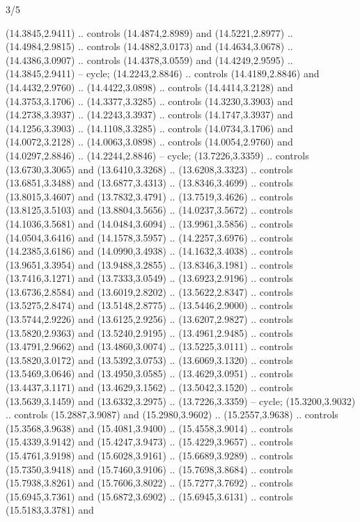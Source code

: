 \begin{flagdescription}{3/5}
{\begin{scope}[fill=gold]
 (14.3845,2.9411) .. controls (14.4874,2.8989) and
  (14.5221,2.8977) .. (14.4984,2.9815) .. controls (14.4882,3.0173) and
  (14.4634,3.0678) .. (14.4386,3.0907) .. controls (14.4378,3.0559) and
  (14.4249,2.9595) .. (14.3845,2.9411) -- cycle;
 (14.2243,2.8846) .. controls (14.4189,2.8846) and
  (14.4432,2.9760) .. (14.4422,3.0898) .. controls (14.4414,3.2128) and
  (14.3753,3.1706) .. (14.3377,3.3285) .. controls (14.3230,3.3903) and
  (14.2738,3.3937) .. (14.2243,3.3937) .. controls (14.1747,3.3937) and
  (14.1256,3.3903) .. (14.1108,3.3285) .. controls (14.0734,3.1706) and
  (14.0072,3.2128) .. (14.0063,3.0898) .. controls (14.0054,2.9760) and
  (14.0297,2.8846) .. (14.2244,2.8846) -- cycle;
 (13.7226,3.3359) .. controls (13.6730,3.3065) and
  (13.6410,3.3268) .. (13.6208,3.3323) .. controls (13.6851,3.3488) and
  (13.6877,3.4313) .. (13.8346,3.4699) .. controls (13.8015,3.4607) and
  (13.7832,3.4791) .. (13.7519,3.4626) .. controls (13.8125,3.5103) and
  (13.8804,3.5656) .. (14.0237,3.5672) .. controls (14.1036,3.5681) and
  (14.0484,3.6094) .. (13.9961,3.5856) .. controls (14.0504,3.6416) and
  (14.1578,3.5957) .. (14.2257,3.6976) .. controls (14.2385,3.6186) and
  (14.0990,3.4938) .. (14.1632,3.4038) .. controls (13.9651,3.3954) and
  (13.9488,3.2855) .. (13.8346,3.1981) .. controls (13.7416,3.1271) and
  (13.7333,3.0549) .. (13.6923,2.9196) .. controls (13.6736,2.8584) and
  (13.6019,2.8202) .. (13.5622,2.8347) .. controls (13.5275,2.8474) and
  (13.5148,2.8775) .. (13.5446,2.9000) .. controls (13.5744,2.9226) and
  (13.6125,2.9256) .. (13.6207,2.9827) .. controls (13.5820,2.9363) and
  (13.5240,2.9195) .. (13.4961,2.9485) .. controls (13.4791,2.9662) and
  (13.4860,3.0074) .. (13.5225,3.0111) .. controls (13.5820,3.0172) and
  (13.5392,3.0753) .. (13.6069,3.1320) .. controls (13.5469,3.0646) and
  (13.4950,3.0585) .. (13.4629,3.0951) .. controls (13.4437,3.1171) and
  (13.4629,3.1562) .. (13.5042,3.1520) .. controls (13.5639,3.1459) and
  (13.6332,3.2975) .. (13.7226,3.3359) -- cycle;
 (15.3200,3.9032) .. controls (15.2887,3.9087) and
  (15.2980,3.9602) .. (15.2557,3.9638) .. controls (15.3568,3.9638) and
  (15.4081,3.9400) .. (15.4558,3.9014) .. controls (15.4339,3.9142) and
  (15.4247,3.9473) .. (15.4229,3.9657) .. controls (15.4761,3.9198) and
  (15.6028,3.9161) .. (15.6689,3.9289) .. controls (15.7350,3.9418) and
  (15.7460,3.9106) .. (15.7698,3.8684) .. controls (15.7938,3.8261) and
  (15.7606,3.8022) .. (15.7277,3.7692) .. controls (15.6945,3.7361) and
  (15.6872,3.6902) .. (15.6945,3.6131) .. controls (15.5183,3.3781) and

\end{scope}}
\end{flagdescription}
